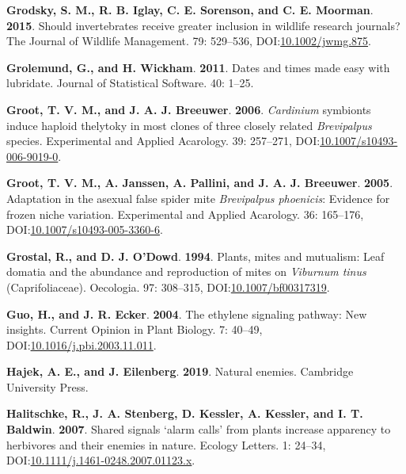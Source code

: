 \documentclass[12pt,final,CPage]{ufthesis}
\newlength{\cslhangindent}
\newenvironment{CSLReferences}[2] %
{%
	\setlength{\parindent}{0pt}
	\ifodd #1 \everypar{\setlength{\hangindent}{\cslhangindent}}\ignorespaces\fi
	\ifnum #2 > 0
	\setlength{\parskip}{#2\baselineskip}
	\fi
}%
{}
\begin{document}
{\begin{CSLReferences}{1}{0}
  \leavevmode{}%
  \textbf{Grodsky, S. M., R. B. Iglay, C. E. Sorenson, and C. E. Moorman}. \textbf{2015}. Should invertebrates receive greater inclusion in wildlife research journals? The Journal of Wildlife Management. 79: 529--536, DOI:\href{https://doi.org/10.1002/jwmg.875}{10.1002/jwmg.875}.

  \leavevmode{}%
  \textbf{Grolemund, G., and H. Wickham}. \textbf{2011}. Dates and times made easy with {lubridate}. Journal of Statistical Software. 40: 1--25.

  \leavevmode{}%
  \textbf{Groot, T. V. M., and J. A. J. Breeuwer}. \textbf{2006}. \emph{Cardinium} symbionts induce haploid thelytoky in most clones of three closely related {\emph{Brevipalpus}} species. Experimental and Applied Acarology. 39: 257--271, DOI:\href{https://doi.org/10.1007/s10493-006-9019-0}{10.1007/s10493-006-9019-0}.

  \leavevmode{}%
  \textbf{Groot, T. V. M., A. Janssen, A. Pallini, and J. A. J. Breeuwer}. \textbf{2005}. Adaptation in the asexual false spider mite {\emph{Brevipalpus phoenicis}}: Evidence for frozen niche variation. Experimental and Applied Acarology. 36: 165--176, DOI:\href{https://doi.org/10.1007/s10493-005-3360-6}{10.1007/s10493-005-3360-6}.

  \leavevmode{}%
  \textbf{Grostal, R., and D. J. O'Dowd}. \textbf{1994}. Plants, mites and mutualism: Leaf domatia and the abundance and reproduction of mites on {\emph{Viburnum tinus}} ({Caprifoliaceae}). Oecologia. 97: 308--315, DOI:\href{https://doi.org/10.1007/bf00317319}{10.1007/bf00317319}.

  \leavevmode{}%
  \textbf{Guo, H., and J. R. Ecker}. \textbf{2004}. The ethylene signaling pathway: New insights. Current Opinion in Plant Biology. 7: 40--49, DOI:\href{https://doi.org/10.1016/j.pbi.2003.11.011}{10.1016/j.pbi.2003.11.011}.

  \leavevmode{}%
  \textbf{Hajek, A. E., and J. Eilenberg}. \textbf{2019}. Natural enemies. Cambridge University Press.

  \leavevmode{}%
  \textbf{Halitschke, R., J. A. Stenberg, D. Kessler, A. Kessler, and I. T. Baldwin}. \textbf{2007}. Shared signals {\textendash}{`alarm calls'} from plants increase apparency to herbivores and their enemies in nature. Ecology Letters. 1: 24--34, DOI:\href{https://doi.org/10.1111/j.1461-0248.2007.01123.x}{10.1111/j.1461-0248.2007.01123.x}.


\end{CSLReferences}}
\end{document}
